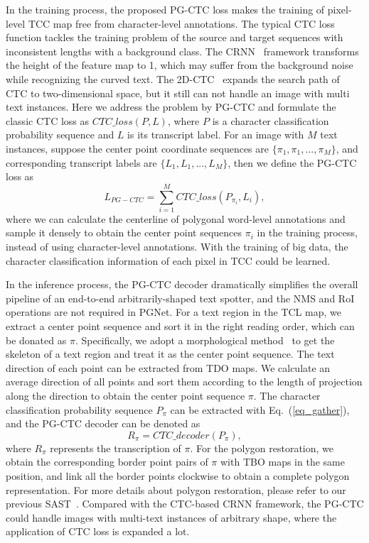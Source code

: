 \documentclass[letterpaper]{article} \usepackage{aaai21}  \usepackage{times}  \usepackage{helvet} \usepackage{courier}  \usepackage[hyphens]{url}  \usepackage{graphicx} \urlstyle{rm} \def\UrlFont{\rm}  \usepackage{natbib}  \usepackage{caption} \usepackage{bm}
\begin{document}
In the training process, the proposed PG-CTC loss makes the training of pixel-level TCC map free from character-level annotations. The typical CTC loss function tackles the training problem of the source and target sequences with inconsistent lengths with a background class. The CRNN~\cite{shi2017crnn} framework transforms the height of the feature map to 1, which may suffer from the background noise while recognizing the curved text. The 2D-CTC~\cite{wan20192dctc} expands the search path of CTC to two-dimensional space, but it still can not handle an image with multi text instances. Here we address the problem by PG-CTC and formulate the classic CTC loss as $CTC\_loss(P, L)$, where $P$ is a character classification probability sequence and $L$ is its transcript label. For an image with ${M}$ text instances, suppose the center point coordinate sequences are $\{\pi_1, \pi_1, ..., \pi_M\}$, and corresponding transcript labels are $\{L_1, L_1, ..., L_M\}$, then we define the PG-CTC loss as
\begin{equation}
L_{PG-CTC} = \sum_{i=1}^M CTC\_loss(P_{\pi_{i}}, L_i),
\end{equation}
where we can calculate the centerline of polygonal word-level annotations and sample it densely to obtain the center point sequences $\pi_i$ in the training process, instead of using character-level annotations. With the training of big data, the character classification information of each pixel in TCC could be learned. 

In the inference process, the PG-CTC decoder dramatically simplifies the overall pipeline of an end-to-end arbitrarily-shaped text spotter, and the NMS and RoI operations are not required in PGNet. For a text region in the TCL map, we extract a center point sequence and sort it in the right reading order, which can be donated as ${\pi}$. Specifically, we adopt a morphological method~\cite{zhang1984fast} to get the skeleton of a text region and treat it as the center point sequence. The text direction of each point can be extracted from TDO maps. We calculate an average direction of all points and sort them according to the length of projection along the direction to obtain the center point sequence ${\pi}$. 
The character classification probability sequence $P_{\pi}$ can be extracted with Eq.~(\ref{eq_gather}), and the PG-CTC decoder can be denoted as 
\begin{equation}
R_{\pi} = CTC\_decoder(P_{\pi}),
\end{equation}
where $R_{\pi}$ represents the transcription of ${\pi}$. For the polygon restoration, we obtain the corresponding border point pairs of ${\pi}$ with TBO maps in the same position, and link all the border points clockwise to obtain a complete polygon representation. For more details about polygon restoration, please refer to our previous SAST~\cite{wang2019single}. Compared with the CTC-based CRNN framework, the PG-CTC could handle images with multi-text instances of arbitrary shape, where the application of CTC loss is expanded a lot. 
\end{document}
